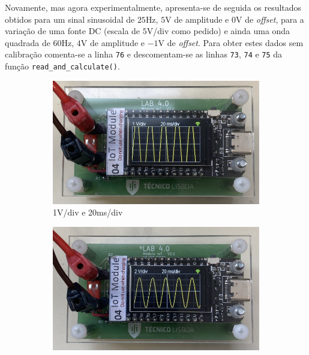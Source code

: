 Novamente, mas agora experimentalmente, apresenta-se de seguida os resultados obtidos para um sinal sinusoidal de $25$Hz, $5$V de amplitude e $0$V de \textit{offset}, para a variação de uma fonte DC (escala de $5$V/div como pedido) e ainda uma onda quadrada de $60$Hz, $4$V de amplitude e $-1$V de \textit{offset}. Para obter estes dados sem calibração comenta-se a linha \texttt{76} e descomentam-se as linhas \texttt{73}, \texttt{74} e \texttt{75} da função \texttt{read\_and\_calculate()}.

\vspace{1cm}

\begin{figure}[H]
    \centering
    \begin{subfigure}{0.35\textwidth}
        \centering
        \includegraphics[width=1\linewidth]{Imagens/Testes no laboratório/Não calibrado/Vertical 1V.png}
        \captionsetup{justification=centering}
        \caption{1V/div e 20ms/div}
        \label{fig:1V/div e 20ms/div não calibrado}
    \end{subfigure}
    \begin{subfigure}{0.35\textwidth}
        \centering
        \includegraphics[width=1\linewidth]{Imagens/Testes no laboratório/Não calibrado/Vertical 2V.png}

\end{subfigure}
\end{figure}
